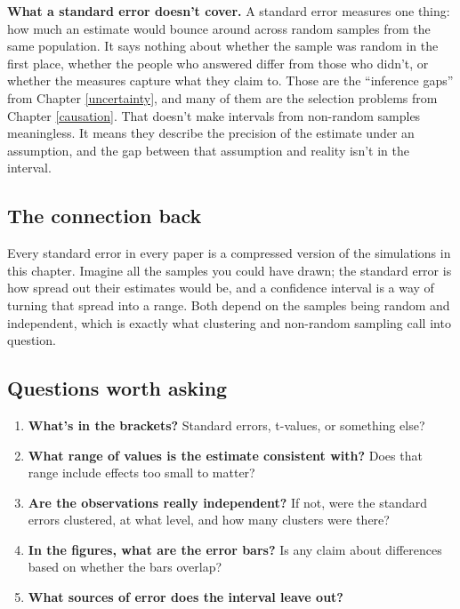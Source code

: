 \documentclass[
]{book}
\providecommand{\tightlist}{%
  \setlength{\itemsep}{0pt}\setlength{\parskip}{0pt}}
\begin{document}
\textbf{What a standard error doesn't cover.} A standard error measures one thing: how much an estimate would bounce around across random samples from the same population. It says nothing about whether the sample was random in the first place, whether the people who answered differ from those who didn't, or whether the measures capture what they claim to. Those are the ``inference gaps'' from Chapter \ref{uncertainty}, and many of them are the selection problems from Chapter \ref{causation}. That doesn't make intervals from non-random samples meaningless. It means they describe the precision of the estimate under an assumption, and the gap between that assumption and reality isn't in the interval.

\subsection{The connection back}\label{the-connection-back-6}

Every standard error in every paper is a compressed version of the simulations in this chapter. Imagine all the samples you could have drawn; the standard error is how spread out their estimates would be, and a confidence interval is a way of turning that spread into a range. Both depend on the samples being random and independent, which is exactly what clustering and non-random sampling call into question.

\subsection{Questions worth asking}\label{questions-worth-asking-6}

\begin{enumerate}
\def\labelenumi{\arabic{enumi}.}
\tightlist
\item
  \textbf{What's in the brackets?} Standard errors, t-values, or something else?
\item
  \textbf{What range of values is the estimate consistent with?} Does that range include effects too small to matter?
\item
  \textbf{Are the observations really independent?} If not, were the standard errors clustered, at what level, and how many clusters were there?
\item
  \textbf{In the figures, what are the error bars?} Is any claim about differences based on whether the bars overlap?
\item
  \textbf{What sources of error does the interval leave out?}
\end{enumerate}
\end{document}
